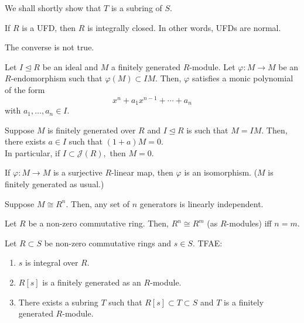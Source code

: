 \documentclass[12pt]{article}	%
\begin{document}
We shall shortly show that $T$ is a subring of $S.$

\begin{thm}
	If $R$ is a UFD, then $R$ is integrally closed. In other words, UFDs are normal.
\end{thm}
The converse is not true.

\begin{thm}
	Let $I \unlhd R$ be an ideal and $M$ a finitely generated $R$-module. Let $\varphi : M \to M$ be an $R$-endomorphism such that $\varphi(M) \subset IM.$ Then, $\varphi$ satisfies a monic polynomial of the form
	\begin{equation*} 
		x^n + a_1x^{n - 1} + \cdots + a_n
	\end{equation*}
	with $a_1, \ldots, a_n \in I.$
\end{thm}

\begin{cor}[Nakayama]
	Suppose $M$ is finitely generated over $R$ and $I \unlhd R$ is such that $M = IM.$ Then, there exists $a \in I$ such that $(1 + a)M = 0.$\\
	In particular, if $I \subset \mathcal{J}(R),$ then $M = 0.$
\end{cor}

\begin{cor}
	If $\varphi : M \to M$ is a surjective $R$-linear map, then $\varphi$ is an isomorphism. ($M$ is finitely generated as usual.)
\end{cor}

\begin{cor}
	Suppose $M \cong R^n.$ Then, any set of $n$ generators is linearly independent.
\end{cor}

\begin{cor}
	Let $R$ be a non-zero commutative ring. Then, $R^n \cong R^m$ (as $R$-modules) iff $n = m.$
\end{cor}

\begin{thm}
	Let $R \subset S$ be non-zero commutative rings and $s \in S.$ TFAE:
	\begin{enumerate}
		\item $s$ is integral over $R.$
		\item $R[s]$ is a finitely generated as an $R$-module.
		\item There exists a subring $T$ such that $R[s] \subset T \subset S$ and $T$ is a finitely generated $R$-module.
	\end{enumerate}
\end{thm}
\end{document}
